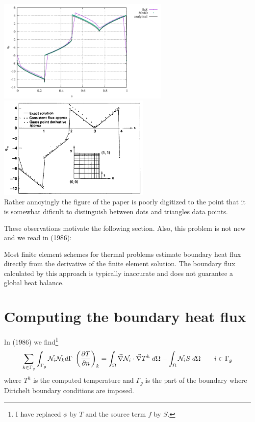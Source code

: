 \begin{center}
\includegraphics[width=8.5cm]{python_codes/fieldstone_173/results/heat_flux_boundary.pdf}
\includegraphics[width=7.5cm]{python_codes/fieldstone_173/images/grls87a}\\
{\captionfont Rather annoyingly the figure of the paper is poorly digitized 
to the point that it is somewhat dificult to distinguish between dots and triangles data points.}
\end{center}

These observations motivate the following section.
Also, this problem is not new and we read in \textcite{mizu86} (1986):
\begin{displayquote}
Most finite element schemes for thermal problems estimate boundary heat flux directly from the
derivative of the finite element solution. The boundary flux calculated by this approach is typically
inaccurate and does not guarantee a global heat balance.
\end{displayquote}

\section*{Computing the boundary heat flux}

In \textcite{mizu86} (1986) we find\footnote{I have replaced $\phi$ by $T$ and 
the source term $f$ by $S$.}
\[
\sum_{k \in \Gamma_g} \int_{\Gamma_g} {\mathcal{N}}_i {\mathcal{N}}_k d\Gamma \; 
\left(
\frac{\partial T}{\partial n}
\right)_k
=
\int_\Omega \vec\nabla {\mathcal{N}}_i \cdot \vec\nabla T^h \; d\Omega
- \int_\Omega {\mathcal{N}}_i S \; d\Omega
\qquad
i \in \Gamma_g
\]
where $T^h$ is the computed temperature and $\Gamma_g$ is the part of the 
boundary where Dirichelt boundary conditions are imposed.

